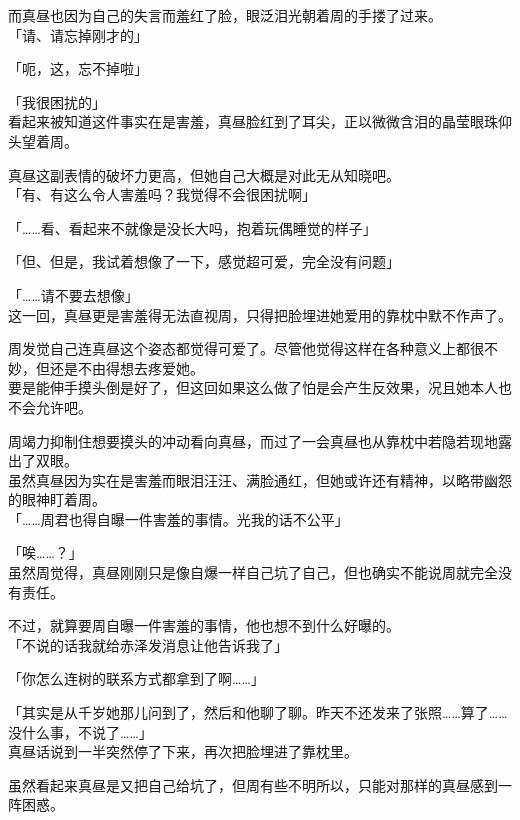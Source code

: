 而真昼也因为自己的失言而羞红了脸，眼泛泪光朝着周的手搂了过来。\\

「请、请忘掉刚才的」

「呃，这，忘不掉啦」

「我很困扰的」\\

看起来被知道这件事实在是害羞，真昼脸红到了耳尖，正以微微含泪的晶莹眼珠仰头望着周。

真昼这副表情的破坏力更高，但她自己大概是对此无从知晓吧。\\

「有、有这么令人害羞吗？我觉得不会很困扰啊」

「……看、看起来不就像是没长大吗，抱着玩偶睡觉的样子」

「但、但是，我试着想像了一下，感觉超可爱，完全没有问题」

「……请不要去想像」\\

这一回，真昼更是害羞得无法直视周，只得把脸埋进她爱用的靠枕中默不作声了。

周发觉自己连真昼这个姿态都觉得可爱了。尽管他觉得这样在各种意义上都很不妙，但还是不由得想去疼爱她。\\

要是能伸手摸头倒是好了，但这回如果这么做了怕是会产生反效果，况且她本人也不会允许吧。

周竭力抑制住想要摸头的冲动看向真昼，而过了一会真昼也从靠枕中若隐若现地露出了双眼。\\

虽然真昼因为实在是害羞而眼泪汪汪、满脸通红，但她或许还有精神，以略带幽怨的眼神盯着周。\\

「……周君也得自曝一件害羞的事情。光我的话不公平」

「唉……？」\\

虽然周觉得，真昼刚刚只是像自爆一样自己坑了自己，但也确实不能说周就完全没有责任。

不过，就算要周自曝一件害羞的事情，他也想不到什么好曝的。\\

「不说的话我就给赤泽发消息让他告诉我了」

「你怎么连树的联系方式都拿到了啊……」

「其实是从千岁她那儿问到了，然后和他聊了聊。昨天不还发来了张照……算了……没什么事，不说了……」\\

真昼话说到一半突然停了下来，再次把脸埋进了靠枕里。

虽然看起来真昼是又把自己给坑了，但周有些不明所以，只能对那样的真昼感到一阵困惑。
